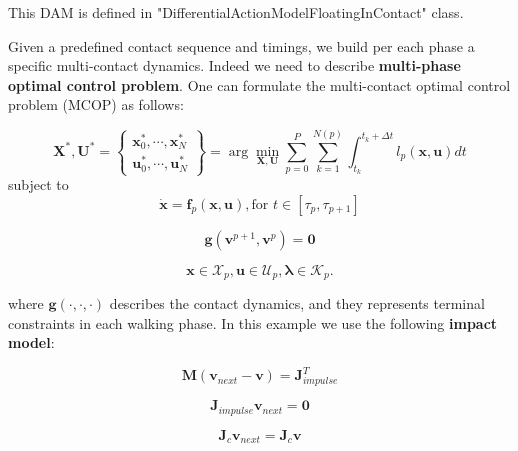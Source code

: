 This DAM is defined in "DifferentialActionModelFloatingInContact" class.

Given a predefined contact sequence and timings, we build per each phase a specific multi-contact dynamics. Indeed we need to describe \textbf{multi-phase optimal control problem}. One can formulate the multi-contact optimal control problem (MCOP) as follows:

$$\mathbf{X}^*,\mathbf{U}^*=
\begin{Bmatrix} \mathbf{x}^*_0,\cdots,\mathbf{x}^*_N \\
				  \mathbf{u}^*_0,\cdots,\mathbf{u}^*_N
\end{Bmatrix} =
\arg\min_{\mathbf{X},\mathbf{U}} \sum_{p=0}^P \sum_{k=1}^{N(p)} \int_{t_k}^{t_k+\Delta t} l_p(\mathbf{x},\mathbf{u})dt$$
subject to
$$ \mathbf{\dot{x}} = \mathbf{f}_p(\mathbf{x},\mathbf{u}), \text{for } t \in [\tau_p,\tau_{p+1}]$$

$$ \mathbf{g}(\mathbf{v}^{p+1},\mathbf{v}^p) = \mathbf{0}$$

$$ \mathbf{x}\in\mathcal{X}_p, \mathbf{u}\in\mathcal{U}_p, \boldsymbol{\lambda}\in\mathcal{K}_p.$$

where $\mathbf{g}(\cdot,\cdot,\cdot)$ describes the contact dynamics, and they represents terminal constraints in each walking phase. In this example we use the following \textbf{impact model}:

$$\mathbf{M}(\mathbf{v}_{next}-\mathbf{v}) = \mathbf{J}_{impulse}^T$$

$$\mathbf{J}_{impulse} \mathbf{v}_{next} = \mathbf{0}$$

$$\mathbf{J}_{c} \mathbf{v}_{next} = \mathbf{J}_{c} \mathbf{v}$$



